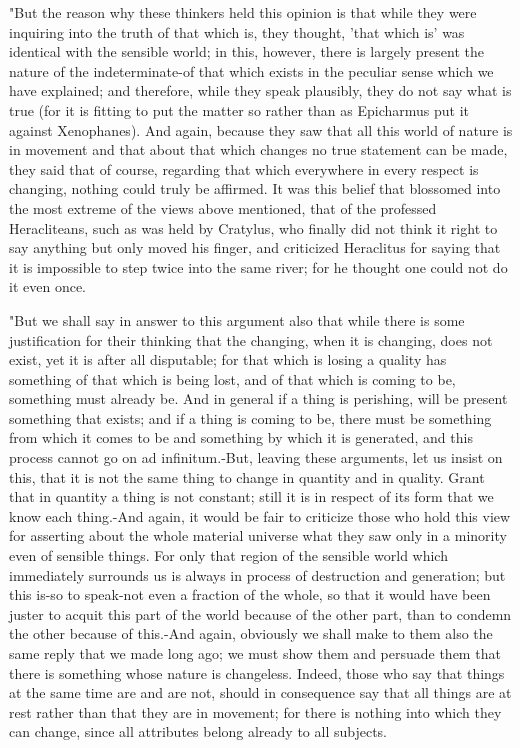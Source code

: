 "But the reason why these thinkers held this opinion is that while
they were inquiring into the truth of that which is, they thought,
'that which is' was identical with the sensible world; in this, however,
there is largely present the nature of the indeterminate-of that which
exists in the peculiar sense which we have explained; and therefore,
while they speak plausibly, they do not say what is true (for it is
fitting to put the matter so rather than as Epicharmus put it against
Xenophanes). And again, because they saw that all this world of nature
is in movement and that about that which changes no true statement
can be made, they said that of course, regarding that which everywhere
in every respect is changing, nothing could truly be affirmed. It
was this belief that blossomed into the most extreme of the views
above mentioned, that of the professed Heracliteans, such as was held
by Cratylus, who finally did not think it right to say anything but
only moved his finger, and criticized Heraclitus for saying that it
is impossible to step twice into the same river; for he thought one
could not do it even once. 

"But we shall say in answer to this argument also that while there
is some justification for their thinking that the changing, when it
is changing, does not exist, yet it is after all disputable; for that
which is losing a quality has something of that which is being lost,
and of that which is coming to be, something must already be. And
in general if a thing is perishing, will be present something that
exists; and if a thing is coming to be, there must be something from
which it comes to be and something by which it is generated, and this
process cannot go on ad infinitum.-But, leaving these arguments, let
us insist on this, that it is not the same thing to change in quantity
and in quality. Grant that in quantity a thing is not constant; still
it is in respect of its form that we know each thing.-And again, it
would be fair to criticize those who hold this view for asserting
about the whole material universe what they saw only in a minority
even of sensible things. For only that region of the sensible world
which immediately surrounds us is always in process of destruction
and generation; but this is-so to speak-not even a fraction of the
whole, so that it would have been juster to acquit this part of the
world because of the other part, than to condemn the other because
of this.-And again, obviously we shall make to them also the same
reply that we made long ago; we must show them and persuade them that
there is something whose nature is changeless. Indeed, those who say
that things at the same time are and are not, should in consequence
say that all things are at rest rather than that they are in movement;
for there is nothing into which they can change, since all attributes
belong already to all subjects. 

